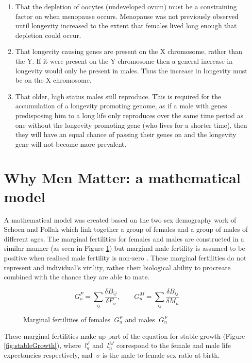 \documentclass[authoryearcitations]{UoYCSproject}
\begin{document}
\begin{enumerate}
\item That the depletion of oocytes (undeveloped ovum) must be a constraining factor on when menopause occurs. Menopause was not previously observed until longevity increased to the extent that females lived long enough that depletion could occur.

\item That longevity causing genes are present on the X chromosome, rather than the Y. If it were present on the Y chromosome then a general increase in longevity would only be present in males. Thus the increase in longevity must be on the X chromosome.

\item That older, high status males still reproduce. This is required for the accumulation of a longevity promoting genome, as if a male with genes predisposing him to a long life only reproduces over the same time period as one without the longevity promoting gene (who lives for a shorter time), then they will have an equal chance of passing their genes on and the longevity gene will not become more prevalent.

\end{enumerate}


\section{Why Men Matter: a mathematical model}
A mathematical model was created \cite{whyMenMatter2007} based on the two sex demography work of Schoen \cite{schoen1981harmonic} and Pollak \cite{pollak1990two} which link together a group of females and a group of males of different ages. The marginal fertilities for females and males are constructed in a similar manner (as seen in Figure \ref{fig:marginalFertilities}) but marginal male fertility is assumed to be positive when realised male fertility is non-zero . These marginal fertilities do not represent and individual's virility, rather their biological ability to procreate combined with the chance they are able to mate.

\begin{figure}[h]
$$\ G^F_n = \sum_{ij} \frac{\delta B_{ij}}{\delta F_n}, \qquad G^M_n = \sum_{ij} \frac{\delta B_{ij}}{\delta M_n}$$
\caption{Marginal fertilities of females $\ G_n^F $ and males $\ G_n^F $ }
\label{fig:marginalFertilities}
\end{figure}

These marginal fertilities make up part of the equation for stable growth (Figure \ref{fig:stableGrowth}), where $\ l_n^F $ and $\ l_n^M $ correspond to the female and male life expectancies respectively, and $\ \sigma $ is the male-to-female sex ratio at birth.
\end{document}
